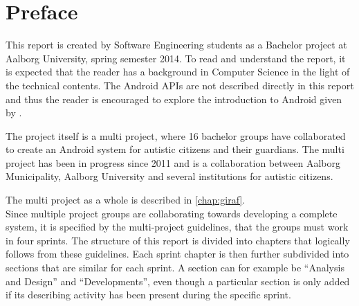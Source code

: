 \newcommand{\headerPreface}{Preface}
\cleardoublepage
{}
\pdfbookmark{\headerPreface}{chap:preface}
\chapter*{\headerPreface}\label{chap:preface}













This report is created by Software Engineering students as a Bachelor project at Aalborg University, spring semester 2014.
To read and understand the report, it is expected that the reader has a background in Computer Science in the light of the technical contents.
The Android APIs are not described directly in this report and thus the reader is encouraged to explore the introduction to Android given by \citet{androidIntroduction}.

The project itself is a multi project, where 16 bachelor groups have collaborated to create an Android system for autistic citizens and their guardians.
The multi project has been in progress since 2011 and is a collaboration between Aalborg Municipality, Aalborg University and several institutions for autistic citizens.

The multi project as a whole is described in \cref{chap:giraf}.\\
Since multiple project groups are collaborating towards developing a complete system, it is specified by the multi-project guidelines, that the groups must work in four sprints.
The structure of this report is divided into chapters that logically follows from these guidelines.
Each sprint chapter is then further subdivided into sections that are similar for each sprint.
A section can for example be ``Analysis and Design'' and ``Developments'', even though a particular section is only added if its describing activity has been present during the specific sprint.\\

